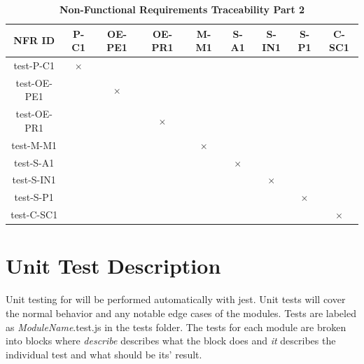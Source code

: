 \documentclass[12pt, titlepage]{article}
\begin{document}
\begin{table}[H]
\centering
\begin{tabular}{|c|c|c|c|c|c|c|c|c|}
\hline
NFR ID & P-C1 & OE-PE1 & OE-PR1 & M-M1 & S-A1 & S-IN1 & S-P1 & C-SC1 \\
\hline 
test-P-C1 & $\times$ & & & & & & &   \\ \hline
test-OE-PE1 &  & $\times$  & & & & & &   \\ \hline
test-OE-PR1 &  &  & $\times$  & & & & &   \\ \hline
test-M-M1 &  & & & $\times$  & & & &   \\ \hline
test-S-A1 &  &  & & & $\times$   & & &   \\ \hline
test-S-IN1 &  &  & & &    & $\times$ & &   \\ \hline
test-S-P1 &  &  & & &    &  & $\times$ &   \\ \hline
test-C-SC1 &  &  & & &    &  &  & $\times$  \\ 
\hline
\end{tabular}
\caption{\bf Non-Functional Requirements Traceability Part 2}
\end{table}

\section{Unit Test Description}

Unit testing for \progname{} will be performed automatically with jest. Unit tests will cover the normal behavior and any notable edge cases of the modules. Tests are labeled as \textit{ModuleName}.test.js in the tests folder. The tests for each module are broken into blocks where \textit{describe} describes what the block does and \textit{it} describes the individual test and what should be its' result.



\end{document}
